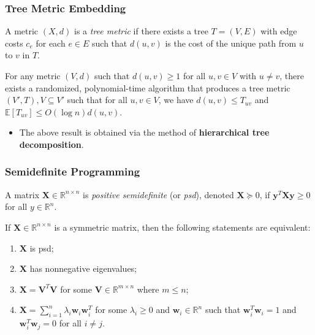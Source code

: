 \documentclass{beamer}
\newcommand{\RR}{\mathbb{R}}
\newcommand{\EE}{\mathbb{E}}
\begin{document}
    \begin{frame}
        \frametitle{Tree Metric Embedding}
    
        \begin{definition}
            A metric $(X, d)$ is a \emph{tree metric} if there exists a tree $T = (V, E)$ with edge costs $c_e$ for each $e \in E$ such that $d(u, v)$ is the cost of the unique path from $u$ to $v$ in $T$.
        \end{definition}

        \pause

        \begin{theorem}
            For any metric $(V, d)$ such that $d(u, v) \geq 1$ for all $u, v \in V$ with $u \neq v$, there exists a randomized, polynomial-time algorithm that produces a tree metric $(V', T), V \subseteq V'$ such that for all $u, v \in V$, we have $d(u, v) \leq T_{uv}$ and $\EE[T_{uv}] \leq O(\log n) d(u, v)$.
        \end{theorem}

        \pause

        \begin{itemize}
            \item The above result is obtained via the method of {\bf hierarchical tree decomposition}.
        \end{itemize}
    \end{frame}

    \begin{frame}
        \frametitle{Semidefinite Programming}
    
        \begin{definition}
            A matrix $\mathbf X \in \RR^{n \times n}$ is \emph{positive semidefinite} (or \emph{psd}), denoted $\mathbf X \succeq 0$, if $\mathbf y^T \mathbf X \mathbf y \geq 0$ for all $y \in \RR^n$.
        \end{definition}

        \begin{fact}
            If $\mathbf X \in \RR^{n \times n}$ is a symmetric matrix, then the following statements are equivalent:
            \begin{enumerate}
                \item $\mathbf X$ is psd;
                \item $\mathbf X$ has nonnegative eigenvalues;
                \item $\mathbf X = \mathbf V^T \mathbf V$ for some $\mathbf V \in \RR^{m \times n}$ where $m \leq n$;
                \item $\mathbf X = \sum_{i = 1}^n \lambda_i \mathbf w_i \mathbf w_i^T$ for some $\lambda_i \geq 0$ and $\mathbf w_i \in \RR^n$ such that $\mathbf w_i^T \mathbf w_i = 1$ and $\mathbf w_i^T \mathbf w_j = 0$ for all $i \neq j$.
            \end{enumerate}
        \end{fact}
    \end{frame}
\end{document}
